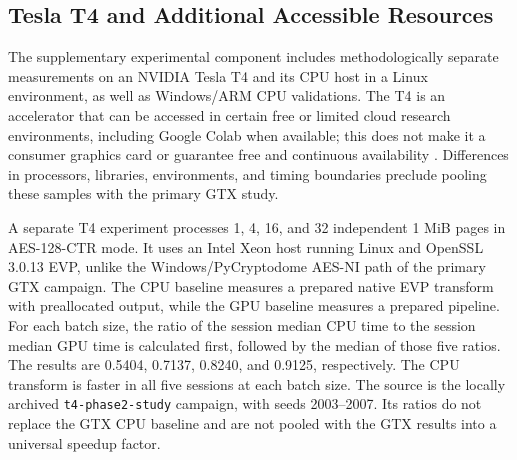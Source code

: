 \documentclass[11pt,b5paper]{article}
\begin{document}
\subsection{Tesla T4 and Additional Accessible Resources}
The supplementary experimental component includes methodologically separate measurements on an NVIDIA Tesla T4 and its CPU host in a Linux environment, as well as Windows/ARM CPU validations. The T4 is an accelerator that can be accessed in certain free or limited cloud research environments, including Google Colab when available; this does not make it a consumer graphics card or guarantee free and continuous availability \citep{colab}. Differences in processors, libraries, environments, and timing boundaries preclude pooling these samples with the primary GTX study.\par
A separate T4 experiment processes 1, 4, 16, and 32 independent 1 MiB pages in AES-128-CTR mode. It uses an Intel Xeon host running Linux and OpenSSL 3.0.13 EVP, unlike the Windows/PyCryptodome AES-NI path of the primary GTX campaign. The CPU baseline measures a prepared native EVP transform with preallocated output, while the GPU baseline measures a prepared pipeline. For each batch size, the ratio of the session median CPU time to the session median GPU time is calculated first, followed by the median of those five ratios. The results are 0.5404, 0.7137, 0.8240, and 0.9125, respectively. The CPU transform is faster in all five sessions at each batch size. The source is the locally archived \texttt{t4-phase2-study} campaign, with seeds 2003--2007. Its ratios do not replace the GTX CPU baseline and are not pooled with the GTX results into a universal speedup factor.
\end{document}

